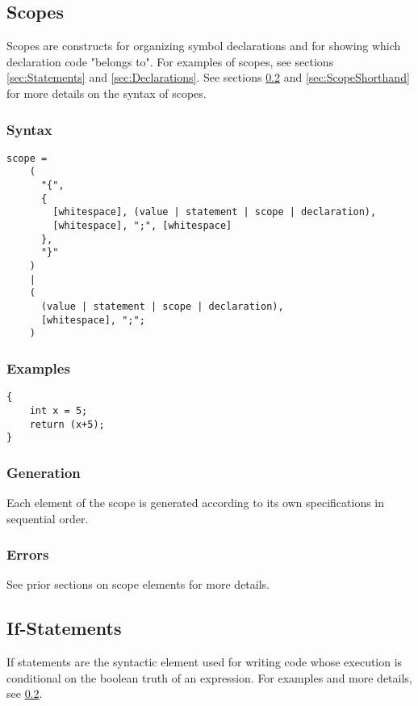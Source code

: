 \documentclass[10pt,a4paper]{article}
\begin{document}
\newpage



\subsection{Scopes}
\label{sec:Scopes}
Scopes are constructs for organizing symbol declarations and for showing which declaration code "belongs to". For examples of scopes, see sections \ref{sec:Statements} and \ref{sec:Declarations}. See sections \ref{sec:IfStatements} and \ref{sec:ScopeShorthand} for more details on the syntax of scopes.

\subsubsection{Syntax}
\begin{verbatim}
scope =
    (
      "{",
      {
        [whitespace], (value | statement | scope | declaration),
        [whitespace], ";", [whitespace]
      },
      "}"
    )
    |
    (
      (value | statement | scope | declaration),
      [whitespace], ";";
    )
\end{verbatim}

\subsubsection{Examples}
\begin{verbatim}
{
    int x = 5;
    return (x+5);
}
\end{verbatim}

\subsubsection{Generation}
Each element of the scope is generated according to its own specifications in sequential order.

\subsubsection{Errors}
See prior sections on scope elements for more details.

\newpage



\subsection{If-Statements}
\label{sec:IfStatements}
If statements are the syntactic element used for writing code whose execution is conditional on the boolean truth of an expression. For examples and more details, see \ref{sec:IfStatements}.
\end{document}
